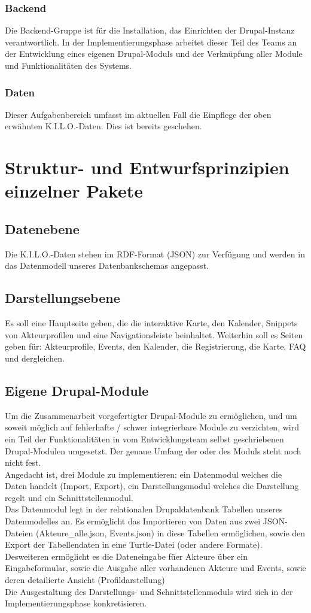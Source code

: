 \documentclass{swp}
\begin{document}
\subsubsection{Backend}
Die Backend-Gruppe ist f\"ur die Installation, das Einrichten der Drupal-Instanz verantwortlich. In der Implementierungsphase arbeitet dieser Teil des Teams an der Entwicklung eines eigenen Drupal-Moduls und der Verkn\"upfung aller Module und Funktionalit\"aten des Systems.
\subsubsection{Daten}
Dieser Aufgabenbereich umfasst im aktuellen Fall die Einpflege der oben erw\"ahnten K.I.L.O.-Daten. Dies ist bereits geschehen.
\section{Struktur- und Entwurfsprinzipien einzelner Pakete}
\subsection{Datenebene}
Die K.I.L.O.-Daten stehen im RDF-Format (JSON) zur Verf\"ugung und werden in das Datenmodell unseres Datenbankschemas angepasst.
\subsection{Darstellungsebene}
Es soll eine Hauptseite geben, die die interaktive Karte, den Kalender, Snippets von Akteurprofilen und eine Navigationsleiste beinhaltet. Weiterhin soll es Seiten geben f\"ur: Akteurprofile, Events, den Kalender, die Registrierung, die Karte, FAQ und dergleichen.
\subsection{Eigene Drupal-Module}
Um die Zusammenarbeit vorgefertigter Drupal-Module zu erm\"oglichen, und um soweit m\"oglich auf fehlerhafte / schwer integrierbare Module zu verzichten, wird ein Teil der Funktionalit\"aten in vom Entwicklungsteam selbst geschriebenen Drupal-Modulen umgesetzt. Der genaue Umfang der oder des Moduls steht noch nicht fest.\\
Angedacht ist, drei Module zu implementieren: ein Datenmodul welches die Daten handelt (Import, Export), ein Darstellungsmodul welches die Darstellung regelt und ein Schnittstellenmodul.\\
Das Datenmodul legt in der relationalen Drupaldatenbank Tabellen unseres Datenmodelles an. Es erm\"oglicht das Importieren von Daten aus zwei JSON-Dateien (Akteure\_{}alle.json, Events.json) in diese Tabellen erm\"oglichen, sowie den Export der Tabellendaten in eine Turtle-Datei (oder andere Formate). Desweiteren erm\"oglicht es die Dateneingabe f\"uer Akteure \"uber ein Eingabeformular, sowie die Ausgabe aller vorhandenen Akteure und Events, sowie deren detailierte Ansicht (Profildarstellung)\\
Die Ausgestaltung des Darstellungs- und Schnittstellenmoduls wird sich in der Implementierungsphase konkretisieren.
\end{document}
